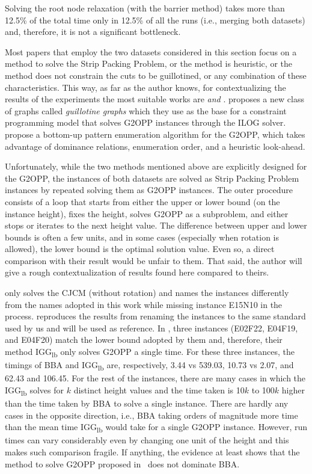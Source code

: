 Solving the root node relaxation (with the barrier method) takes more than 12.5\% of the total time only in 12.5\% of all the runs (i.e., merging both datasets) and, therefore, it is not a significant bottleneck.

Most papers that employ the two datasets considered in this section focus on a method to solve the Strip Packing Problem, or the method is heuristic, or the method does not constrain the cuts to be guillotined, or any combination of these characteristics.
This way, as far as the author knows, for contextualizing the results of the experiments the most suitable works are \citet{clautiaux:2011} \emph{and} \citet{fleszar:2016}.
\citet{clautiaux:2011} proposes a new class of graphs called \emph{guillotine graphs} which they use as the base for a constraint programming model that solves G2OPP instances through the ILOG solver.
\citet{fleszar:2016} propose a bottom-up pattern enumeration algorithm for the G2OPP, which takes advantage of dominance relations, enumeration order, and a heuristic look-ahead.

Unfortunately, while the two methods mentioned above are explicitly designed for the G2OPP, the instances of both datasets are solved as Strip Packing Problem instances by repeated solving them as G2OPP instances.
The outer procedure consists of a loop that starts from either the upper or lower bound (on the instance height), fixes the height, solves G2OPP as a subproblem, and either stops or iterates to the next height value.
The difference between upper and lower bounds is often a few units, and in some cases (especially when rotation is allowed), the lower bound is the optimal solution value.
Even so, a direct comparison with their result would be unfair to them.
That said, the author will give a rough contextualization of results found here compared to theirs.

\citet{clautiaux:2011} only solves the CJCM (without rotation) and names the instances differently from the names adopted in this work while missing instance E15N10 in the process. \citet{fleszar:2016} reproduces the results from \citet{clautiaux:2011} renaming the instances to the same standard used by us and will be used as reference.
In \citet{clautiaux:2011}, three instances (E02F22, E04F19, and E04F20) match the lower bound adopted by them and, therefore, their method IGG\textsubscript{lb} only solves G2OPP a single time.
For these three instances, the timings of BBA and IGG\textsubscript{lb} are, respectively, 3.44 vs 539.03, 10.73 vs 2.07, and 62.43 and 106.45.
For the rest of the instances, there are many cases in which the IGG\textsubscript{lb} solves for \(k\) distinct height values and the time taken is 10\(k\) to 100\(k\) higher than the time taken by BBA to solve a single instance.
There are hardly any cases in the opposite direction, i.e., BBA taking orders of magnitude more time than the mean time IGG\textsubscript{lb} would take for a single G2OPP instance.
However, run times can vary considerably even by changing one unit of the height and this makes such comparison fragile.
If anything, the evidence at least shows that the method to solve G2OPP proposed in~\citet{clautiaux:2011} does not dominate BBA.

